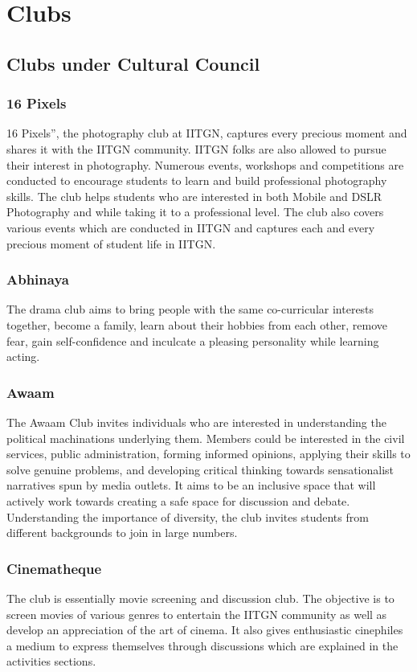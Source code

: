 \documentclass[12pt]{article}
\begin{document}
\newpage
\section{Clubs}
\subsection{Clubs under Cultural Council} \label{Clubs under Cultural Council}
\subsubsection{16 Pixels}
16 Pixels”, the photography club at IITGN, captures every precious moment and shares it with the IITGN community. IITGN folks are also allowed to pursue their interest in photography. Numerous events, workshops and competitions are conducted to encourage students to learn and build professional photography skills. The club helps students who are interested in both Mobile and DSLR Photography and while taking it to a professional level. The club also covers various events which are conducted in IITGN and captures each and every precious moment of student life in IITGN.

\subsubsection{Abhinaya}
The drama club aims to bring people with the same co-curricular interests together, become a family, learn about their hobbies from each other, remove fear, gain self-confidence and inculcate a pleasing personality while learning acting.

\subsubsection{Awaam}
The Awaam Club invites individuals who are interested in understanding the political machinations underlying them. Members could be interested in the civil services, public administration, forming informed opinions, applying their skills to solve genuine problems, and developing critical thinking towards sensationalist narratives spun by media outlets. It aims to be an inclusive space that will actively work towards creating a safe space for discussion and debate. Understanding the importance of diversity, the club invites students from different backgrounds to join in large numbers.

\subsubsection{Cinematheque}
The club is essentially movie screening and discussion club. The objective is to screen movies of various genres to entertain the IITGN community as well as develop an appreciation of the art of cinema. It also gives enthusiastic cinephiles a medium to express themselves through discussions which are explained in the activities sections.
\end{document}
